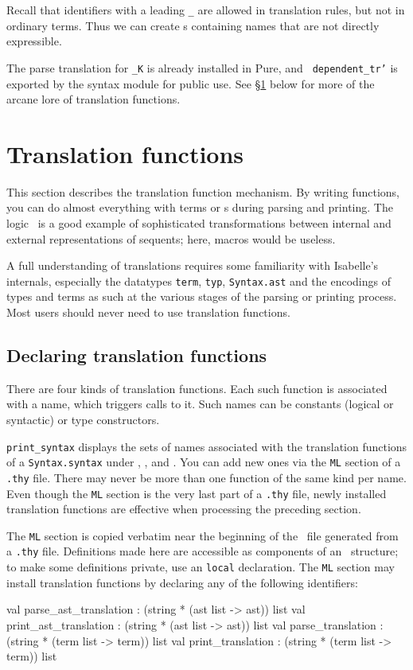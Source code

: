 Recall that identifiers with a leading {\tt _} are allowed in translation
rules, but not in ordinary terms.  Thus we can create \AST{}s containing
names that are not directly expressible.

The parse translation for {\tt _K} is already installed in Pure, and {\tt
dependent_tr'} is exported by the syntax module for public use.  See
\S\ref{sec:tr_funs} below for more of the arcane lore of translation functions.


\section{Translation functions} \label{sec:tr_funs}
%
This section describes the translation function mechanism.  By writing
\ML{} functions, you can do almost everything with terms or \AST{}s during
parsing and printing.  The logic \LK\ is a good example of sophisticated
transformations between internal and external representations of sequents;
here, macros would be useless.

A full understanding of translations requires some familiarity
with Isabelle's internals, especially the datatypes {\tt term}, {\tt typ},
{\tt Syntax.ast} and the encodings of types and terms as such at the various
stages of the parsing or printing process.  Most users should never need to
use translation functions.

\subsection{Declaring translation functions}
There are four kinds of translation functions.  Each such function is
associated with a name, which triggers calls to it.  Such names can be
constants (logical or syntactic) or type constructors.

{\tt print_syntax} displays the sets of names associated with the
translation functions of a {\tt Syntax.syntax} under
, ,
 and .  You can
add new ones via the {\tt ML} section of
a {\tt .thy} file.  There may never be more than one function of the same
kind per name.  Even though the {\tt ML} section is the very last part of a
{\tt .thy} file, newly installed translation functions are effective when
processing the preceding section.

The {\tt ML} section is copied verbatim near the beginning of the \ML\ file
generated from a {\tt .thy} file.  Definitions made here are accessible as
components of an \ML\ structure; to make some definitions private, use an
\ML{} {\tt local} declaration.  The {\tt ML} section may install translation
functions by declaring any of the following identifiers:
\begin{ttbox}
val parse_ast_translation : (string * (ast list -> ast)) list
val print_ast_translation : (string * (ast list -> ast)) list
val parse_translation     : (string * (term list -> term)) list
val print_translation     : (string * (term list -> term)) list
\end{ttbox}


